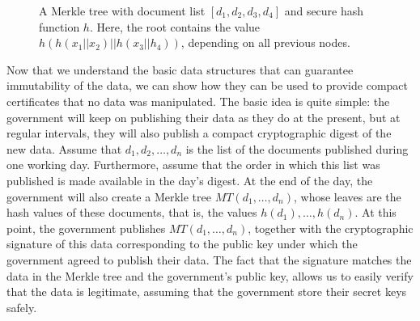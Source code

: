 \begin{figure}
\caption{A Merkle tree with document list $[d_1,d_2,d_3,d_4]$ and secure hash function $h$. Here, the root contains the value $h(h(x_1||x_2)||h(x_3||h_4))$, depending on all previous nodes.}%
\label{merkle_fig}
\end{figure}

\medskip
{} Now that we understand the basic data structures that can guarantee immutability of the data, we can show how they can be used to provide compact certificates that no data was manipulated. The basic idea is quite simple: the government will keep on publishing their data as they do at the present, but at regular intervals, they will also publish a compact cryptographic digest of the new data. Assume that $d_1,d_2,\ldots ,d_n$ is the list of the documents published during one working day. Furthermore, assume that the order in which this list was published is made available in the day's digest. At the end of the day, the government will also create a Merkle tree $MT(d_1,\ldots ,d_n)$, whose leaves are the hash values of these documents, that is, the values $h(d_1),\ldots ,h(d_n)$. At this point, the government publishes $MT(d_1,\ldots ,d_n)$, together with the cryptographic signature of this data corresponding to the public key under which the government agreed to publish their data. The fact that the signature matches the data in the Merkle tree and the government's public key, allows us to easily verify that the data is legitimate, assuming that the government store their secret keys safely.

